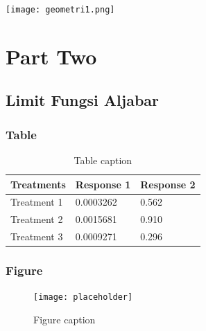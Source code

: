 \documentclass[11pt,fleqn]{book} %
\begin{document}
\texttt{[image: geometri1.png]} 


\part{Part Two}



\chapter{Limit Fungsi Aljabar}

\section{Table}

\begin{table}[h]
\centering
\begin{tabular}{l l l}
\toprule
\textbf{Treatments} & \textbf{Response 1} & \textbf{Response 2}\\
\midrule
Treatment 1 & 0.0003262 & 0.562 \\
Treatment 2 & 0.0015681 & 0.910 \\
Treatment 3 & 0.0009271 & 0.296 \\
\bottomrule
\end{tabular}
\caption{Table caption}
\end{table}


\section{Figure}

\begin{figure}[h]
\centering\texttt{[image: placeholder]}
\caption{Figure caption}
\end{figure}

\end{document}
